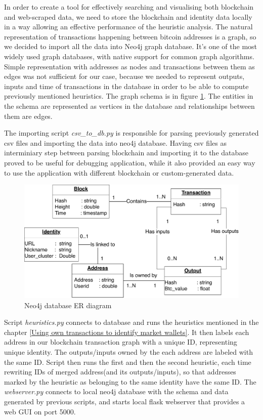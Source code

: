 \documentclass[
  digital, %
  table,   %
  lof,     %
  lot,     %
  oneside
]{fithesis3}
\begin{document}
In order to create a tool for effectively searching and visualising both blockchain and web-scraped
data, we need to store the blockchain and identity data locally in a way allowing an effective
performance of the heuristic analysis.
The natural representation of transactions happening between
bitcoin addresses is a graph, so we decided to import all the data into Neo4j graph database. It's one of the
most widely used graph databases, with native support for common graph algorithms.
Simple representation with addresses as nodes and transactions between them as edges was not
sufficient for our case, because we needed to represent
outputs, inputs and time of transactions in the database in order to be able to compute previously mentioned heuristics. 
The graph schema is in figure \ref{neo4jschema}. The entities in the schema are represented as vertices
 in the database and relationships between them are edges.

The importing script \emph{csv\_to\_db.py} is responsible for parsing
previously generated csv files and importing the data into neo4j database.
Having csv files as interminiary step between parsing blockchain and importing it to the database
proved to be useful for debugging application, while it also provided an easy way to
use the application with different blockchain or custom-generated data.

\begin{figure}[!htb]
    \centering
    \includegraphics[width=1\textwidth]{neo4j-schema}
    \caption{Neo4j database ER diagram}
    \label{neo4jschema}
\end{figure}

Script \emph{heuristics.py} connects to database and runs the heuristics mentioned in the chapter
\ref{Using own transactions to identify market wallets}.
It then labels each address in our blockchain transaction graph
with a unique ID, representing unique identity. The outputs/inputs owned by the each address are labeled
with the same ID. Script then runs the first and then the second heuristic,
each time rewriting IDs of merged address(and its outputs/inputs), so that 
addresses marked by the heuristic as belonging to the same identity have the same ID.
The \emph{webserver.py} connects to local neo4j database with the schema and data generated by previous
scripts, and starts local flask webserver that provides a web GUI on port 5000.
\end{document}
